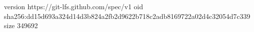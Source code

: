 version https://git-lfs.github.com/spec/v1
oid sha256:dd15d693a324d14d3b824a2fb2d9622b718c2adb8169722a02d4c32054d7c339
size 349692

